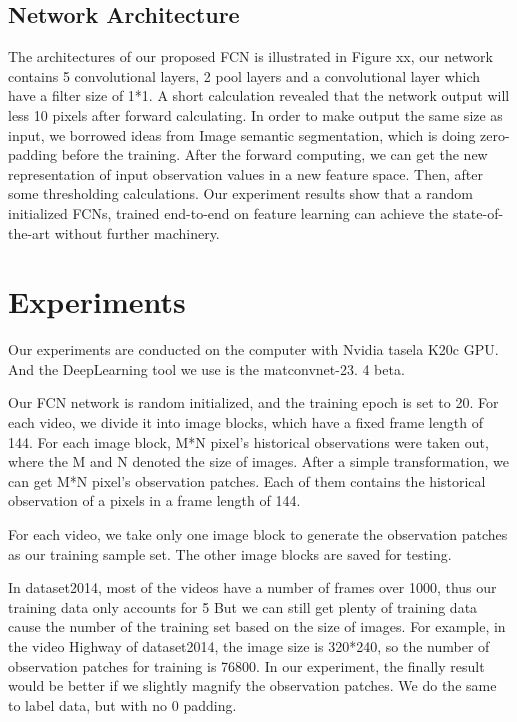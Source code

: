 \documentclass[journal]{IEEEtran}
\begin{document}
\subsection{Network Architecture}
The architectures of our proposed FCN is illustrated in Figure xx, our network contains 5 convolutional layers, 2 pool layers and a convolutional layer which have a filter size of 1*1.
A short calculation revealed that the network output will less 10 pixels after forward calculating.
In order to make output the same size as input, we borrowed ideas from Image semantic segmentation, which is doing zero-padding before the training.
After the forward computing, we can get the new representation of input observation values in a new feature space.
Then, after some thresholding calculations.
Our experiment results show that a random initialized FCNs, trained end-to-end on feature learning can achieve the state-of-the-art without further machinery.




\section{Experiments}
Our experiments are conducted on the computer with Nvidia tasela K20c GPU.
 And the DeepLearning tool we use is the matconvnet-23.
4 beta.

Our FCN network is random initialized, and the training epoch is set to 20.
For each video, we divide it into image blocks, which have a fixed frame length of 144.
For each image block, M*N pixel’s historical observations were taken out, where the M and N denoted the size of images.
After a simple transformation, we can get M*N pixel’s observation patches.
Each of them contains the historical observation of a pixels in a frame length of 144.

For each video, we take only one image block to generate the observation patches as our training sample set.
The other image blocks are saved for testing.

In dataset2014, most of the videos have a number of frames over 1000, thus our training data only accounts for 5%
But we can still get plenty of training data cause the number of the training set based on the size of images.
For example, in the video Highway of dataset2014, the image size is 320*240, so the number of observation patches for training is 76800.
In our experiment, the finally result would be better if we slightly magnify the observation patches.
We do the same to label data, but with no 0 padding.
\end{document}
